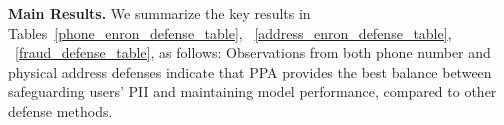 \textbf{Main Results.}
We summarize the key results in Tables~\ref{phone_enron_defense_table}, ~\ref{address_enron_defense_table}, ~\ref{fraud_defense_table}, as follows: Observations from both phone number and physical address defenses indicate that PPA provides the best balance between safeguarding users' PII and maintaining model performance, compared to other defense methods.





\begin{comment}
Table~\ref{address_enron_defense_table} shows that our method, PPA, outperform the Empty Response, Error Injection, and DEPN by {71.0\%, 35.6\%, 9.8\%} on risk score, while marginal increase perplexity score by {14.3\%, 26.1\%} and decrease perplexity score by {}
\end{comment}


\begin{comment}
Applying Dynamic Mix Selected Unlearning on LLaMA2-7b and LLaMA3-8b effectively protects the privacy of 468 persons' phone numbers, achieving both a phone risk score and phone exact match score of zero, while maintaining a model performance score comparable to the Fine-tuned LLaMA2-7b and LLaMA3b-7b, as illustrated in Table~\ref{phone_defense_table} and Table~\ref{llama3_phone_defense_table}, respectively.
\end{comment}






\begin{comment}
\textbf{Main Results.}
We summarize the key results in Table~\ref{phone_defense_table} ~\ref{address_defense_table} as follows: 1) Dynamic Mix Selected Unlearning effectively preserves PII while maintaining model performance; 2) Aside from fine-tuned LLaMA2-7b and DEPN, the Input Rephrase attack is the most potent; and 3) Except for the original LLaMA2-7b and DEPN, the soft prompt attack is more formidable than the black-box attack.
\end{comment}

